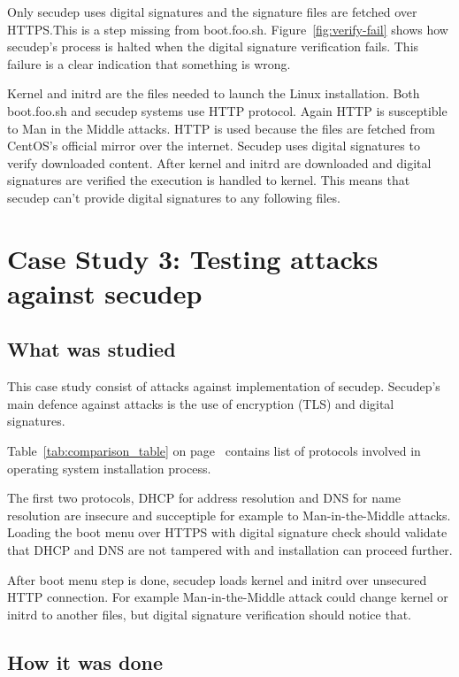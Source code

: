 Only secudep uses digital signatures and the signature files are
fetched over HTTPS.\@ This is a step missing from
boot.foo.sh. Figure~\ref{fig:verify-fail} shows how secudep's process
is halted when the digital signature verification fails. This failure
is a clear indication that something is wrong.

Kernel and initrd are the files needed to launch the Linux
installation. Both boot.foo.sh and secudep systems use HTTP
protocol. Again HTTP is susceptible to Man in the Middle attacks. HTTP
is used because the files are fetched from CentOS's official mirror
over the internet. Secudep uses digital signatures to verify
downloaded content. After kernel and initrd are downloaded and digital
signatures are verified the execution is handled to kernel. This means
that secudep can't provide digital signatures to any following files.


\section{Case Study 3: Testing attacks against secudep}
\label{sec:casestudy3}

\subsection{What was studied}

This case study consist of attacks against implementation of
secudep. Secudep's main defence against attacks is the use of
encryption (TLS) and digital signatures.

Table~\ref{tab:comparison_table} on
page~\pageref{tab:comparison_table} contains list of protocols
involved in operating system installation process.

The first two protocols, DHCP for address resolution and DNS for name
resolution are insecure and succeptiple for example to
Man-in-the-Middle attacks. Loading the boot menu over HTTPS with
digital signature check should validate that DHCP and DNS are not
tampered with and installation can proceed further.

After boot menu step is done, secudep loads kernel and initrd over
unsecured HTTP connection. For example Man-in-the-Middle attack could
change kernel or initrd to another files, but digital signature
verification should notice that.


\subsection{How it was done}

